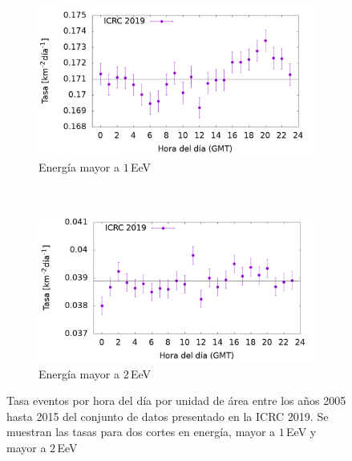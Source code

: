         \begin{figure}[H]
            \centering
            \begin{subfigure}[b]{0.495\textwidth}
            \includegraphics[width=\textwidth]{Graphs/rate_hour_of_the_day/1EeV_ICRC_2019_05_19.png}
            \caption{Energía mayor a $1\,$EeV}
            \label{fig:rate_day_ICRC_19_05_18_2EeV}
            \end{subfigure}\\
            \centering
            \begin{subfigure}[b]{0.495\textwidth}
            \includegraphics[width=\textwidth]{Graphs/rate_hour_of_the_day/2EeV_ICRC_2019_05_18.png}
            \caption{Energía mayor a $2\,$EeV}
            \label{fig:rate_2015_ICRC_19_05_18_2EeV}
            \end{subfigure}%
            \caption{Tasa eventos  por hora del día por unidad de área entre los años 2005 hasta 2015 del conjunto de datos presentado en la ICRC 2019.  Se muestran las tasas para dos cortes en energía, mayor a $1\,$EeV y mayor a $2\,$EeV}\label{fig:rate_new_18_2EeV}
        \end{figure}



